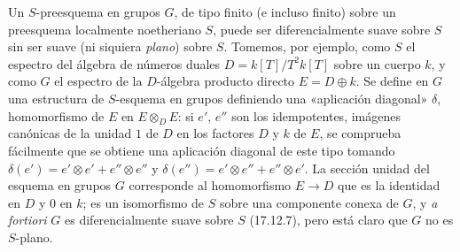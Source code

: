 \begin{remark}[17.12.8]
\label{IV.17.12.8}
Un $S$-preesquema en grupos $G$, de tipo finito (e incluso finito) sobre un preesquema localmente noetheriano $S$, puede ser diferencialmente suave sobre $S$ sin ser suave (ni siquiera \emph{plano}) sobre $S$. Tomemos, por ejemplo, como $S$ el espectro del álgebra de números duales $D=k[T]/T^2k[T]$ sobre un cuerpo $k$, y como $G$ el espectro de la $D$-álgebra producto directo $E=D\oplus k$. Se define en $G$ una estructura de $S$-esquema en grupos definiendo una «aplicación diagonal» $\delta$, homomorfismo de $E$ en $E\otimes_DE$: si $e'$, $e''$ son los idempotentes, imágenes canónicas de la unidad $1$ de $D$ en los factores $D$ y $k$ de $E$, se comprueba fácilmente que se obtiene una aplicación diagonal de este tipo tomando
$\delta(e')=e'\otimes e'+e''\otimes e''$ y $\delta(e'')=e'\otimes e''+e''\otimes e'$.
La sección unidad del esquema en grupos $G$ corresponde al homomorfismo $E\to D$ que es la identidad en $D$ y $0$ en $k$; es un isomorfismo de $S$ sobre una componente conexa de $G$, y \emph{a fortiori} $G$ es diferencialmente suave sobre $S$ (17.12.7), pero está claro que $G$ no es $S$-plano.
\end{remark}
